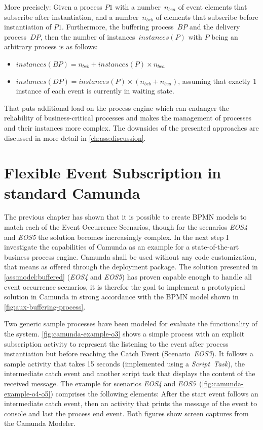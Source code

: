 \medskip \noindent
More precisely: Given a process $P1$ with a number~$n_{bea}$ of event elements that subscribe after instantiation, and a number~$n_{beb}$ of elements that subscribe before instantiation of $P1$. Furthermore, the buffering process~$BP$ and the delivery process~$DP$, then the number of instances~$instances(P)$ with $P$ being an arbitrary process is as follows:

\begin{itemize}
	\item $instances(BP) = n_{beb} + instances(P) \times n_{bea} $
	\item $instances(DP) = instances(P) \times (n_{beb} + n_{bea})$, assuming that exactly 1 instance of each event is currently in waiting state.
\end{itemize}

\noindent That puts additional load on the process engine which can endanger the reliability of business-critical processes and makes the management of processes and their instances more complex.
The downsides of the presented approaches are discussed in more detail in \autoref{ch:ass:discussion}.



\section{Flexible Event Subscription in standard Camunda}\label{ch:assessment-implementation}
The previous chapter has shown that it is possible to create BPMN models to match each of the Event Occurrence Scenarios, though for the scenarios \textit{EOS4} and \textit{EOS5} the solution becomes increasingly complex.
In the next step I investigate the capabilities of Camunda as an example for a state-of-the-art business process engine.
Camunda shall be used without any code customization, that means as offered through the deployment package.
The solution presented in \autoref{ass:model:buffered} (\textit{EOS4} and \textit{EOS5}) has proven capable enough to handle all event occurrence scenarios, it is therefor the goal to implement a prototypical solution in Camunda in strong accordance with the BPMN model shown in \autoref{fig:aux-buffering-process}.

Two generic sample processes have been modeled for evaluate the functionality of the system. \autoref{fig:camunda-example-o3} shows a simple process with an explicit subscription activity to represent the listening to the event after process instantiation but before reaching the Catch Event (Scenario~\textit{EOS3}). It follows a sample activity that takes 15 seconds (implemented using a \textit{Script~Task}), the intermediate catch event and another script task that displays the content of the received message.
The example for scenarios \textit{EOS4} and \textit{EOS5}~(\autoref{fig:camunda-example-o4-o5}) comprises the following elements: After the start event follows an intermediate catch event, then an activity that prints the message of the event to console and last the process end event. Both figures show screen captures from the Camunda Modeler.

